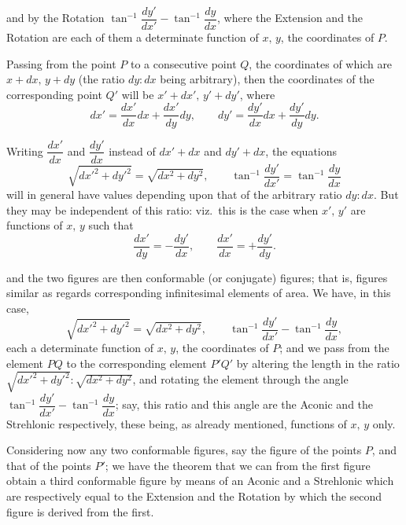 \documentclass[11pt]{article}
\begin{document}
\medskip

\noindent
and by the Rotation $\tan^{-1}\dfrac{dy'}{dx'} - \tan^{-1}\dfrac{dy}{dx}$, where the Extension and the Rotation are
each of them a determinate function of $x,\,y$, the coordinates of $P$.

\medskip

\noindent
Passing from the point $P$ to a consecutive point $Q$, the coordinates of which
are $x + dx,\, y + dy$ (the ratio $dy:dx$ being arbitrary), then the coordinates of the
corresponding point $Q'$ will be $x' + dx',\, y' + dy'$, where
\[
dx' = \frac{dx'}{dx}dx + \frac{dx'}{dy}dy,\qquad dy' = \frac{dy'}{dx}dx + \frac{dy'}{dy}dy.
\]

\noindent
Writing $\dfrac{dx'}{dx}$ and $\dfrac{dy'}{dx}$ instead of $dx' + dx$ and $dy' + dx$, the equations
\[
\sqrt{dx'^2 + dy'^2} = \sqrt{dx^2 + dy^2},\qquad \tan^{-1}\frac{dy'}{dx'} = \tan^{-1}\frac{dy}{dx}
\]
will in general have values depending upon that of the arbitrary ratio $dy:dx$. But
they may be independent of this ratio: viz.\ this is the case when $x',\,y'$ are functions
of $x,\,y$ such that
\[
\frac{dx'}{dy} = -\frac{dy'}{dx},\qquad \frac{dx'}{dx} = +\frac{dy'}{dy}.
\]

\newpage

\noindent
and the two figures are then conformable (or conjugate) figures; that is, figures similar
as regards corresponding infinitesimal elements of area. We have, in this case,
\[
\sqrt{dx'^2 + dy'^2} = \sqrt{dx^2 + dy^2},\qquad \tan^{-1}\frac{dy'}{dx'} - \tan^{-1}\frac{dy}{dx},
\]
each a determinate function of $x,\,y$, the coordinates of $P$; and we pass from the
element $PQ$ to the corresponding element $P'Q'$ by altering the length in the ratio
$\sqrt{dx'^2 + dy'^2}:\sqrt{dx^2 + dy^2}$, and rotating the element through the angle $\tan^{-1}\dfrac{dy'}{dx'} - \tan^{-1}\dfrac{dy}{dx}$;
say, this ratio and this angle are the Aconic and the Strehlonic respectively, these
being, as already mentioned, functions of $x,\,y$ only.

\medskip

\noindent
Considering now any two conformable figures, say the figure of the points $P$,
and that of the points $P'$; we have the theorem that we can from the first figure
obtain a third conformable figure by means of an Aconic and a Strehlonic which
are respectively equal to the Extension and the Rotation by which the second figure
is derived from the first.
\end{document}
